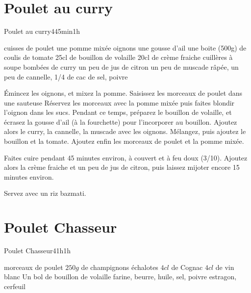 {\section{Poulet au curry}
\begin{recette}{Poulet au curry}{4}{45min}{1h}

\begin{ingredients}
 cuisses de poulet
\ingredient une pomme mixée
 oignons
\ingredient une gousse d'ail
\ingredient une boite (500g) de coulis de tomate
\ingredient 25cl de bouillon de volaille
\ingredient 20cl de crème fraiche
 cuillères à soupe bombées de curry
\ingredient un peu de jus de citron
\ingredient un peu de muscade râpée, un peu de cannelle, 1/4 de cac de sel, poivre
\end{ingredients}

\begin{preparation}
\etape Émincez les oignons, et mixez la pomme.
\etape Saisissez les morceaux de poulet dans une sauteuse
\etape Réservez les morceaux avec la pomme mixée puis faites blondir l'oignon dans les sucs.
\etape Pendant ce temps, préparez le bouillon de volaille, et écrasez la gousse d'ail (à la fourchette) pour l'incorporer au 
bouillon.
\etape Ajoutez alors le curry, la cannelle, la muscade avec les oignons. Mélangez, puis ajoutez le bouillon et la tomate. Ajoutez enfin les morceaux de poulet et la pomme mixée.
\end{preparation}

\begin{cuisson}
Faites cuire pendant 45 minutes environ, à couvert et à feu doux (3/10). Ajoutez alors la crème fraiche et un peu de jus 
de citron, puis laissez mijoter encore 15 minutes environ. 

Servez avec un riz bazmati.
\end{cuisson}
\end{recette}


\section{Poulet Chasseur}
\begin{recette}{Poulet Chasseur}{4}{1h}{1h}
\begin{ingredients}
 morceaux de poulet
\ingredient $250\unit{g}$ de champignons
 échalotes
\ingredient $4\unit{cl}$ de Cognac
\ingredient $4\unit{cl}$ de vin blanc
\ingredient Un bol de bouillon de volaille
\ingredient farine, beurre, huile, sel, poivre
\ingredient estragon, cerfeuil
\end{ingredients}



\end{recette}}

